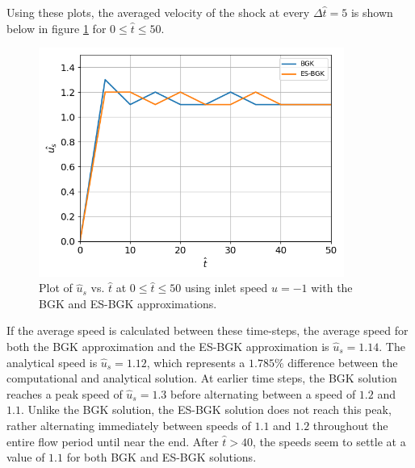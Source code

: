 \documentclass[a4paper]{article}
\begin{document}
\clearpage
Using these plots, the averaged velocity of the shock at every $\Delta\hat{t} = 5$ is shown below in figure \ref{problem_speed_plot} for $0 \leq \hat{t} \leq 50$. 
\begin{figure}[hbt!]
    \centering
    \includegraphics[width=10cm]{plots/problem_speed_BGK_2.png}
    \caption{\centering Plot of $\hat{u}_s$ vs. $\hat{t}$ at $0 \leq \hat{t} \leq 50$ using inlet speed $\hat{u} = -1$ with the BGK and ES-BGK approximations.}
    \label{problem_speed_plot}
\end{figure}

If the average speed is calculated between these time-steps, the average speed for both the BGK approximation and the ES-BGK approximation is $\hat{u}_s = 1.14$. The analytical speed is $\hat{u}_s =1.12$, which represents a $1.785\%$ difference between the computational and analytical solution. At earlier time steps, the BGK solution reaches a peak speed of $\hat{u}_s = 1.3$ before alternating between a speed of $1.2$ and $1.1$. Unlike the BGK solution, the ES-BGK solution does not reach this peak, rather alternating immediately between speeds of $1.1$ and $1.2$ throughout the entire flow period until near the end. After $\hat{t} > 40$, the speeds seem to settle at a value of $1.1$ for both BGK and ES-BGK solutions. 

\clearpage
\end{document}
